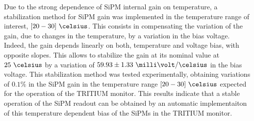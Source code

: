 \begin{enumerate}
\begin{enumerate}

Due to the strong dependence of SiPM internal gain on temperature, a stabilization method for SiPM gain was implemented in the temperature range of interest, $[20-30]~\celsius$. This consists in compensating the variation of the gain, due to changes in the temperature, by a variation in the bias voltage. Indeed, the gain depends linearly on both, temperature and voltage bias, with opposite slopes. This allows to stabilize the gain at its nominal value at $25~\celsius$ by a variation of $59.93 \pm 1.33 ~\milli\volt/\celsius$ in the bias voltage. This stabilization method was tested experimentally, obtaining variations of $0.1\%$ in the SiPM gain in the temperature range $[20-30]~\celsius$ expected for the operation of the TRITIUM monitor. This results indicate that a stable operation of the SiPM readout can be obtained by an automatic implementaiton of this temperature dependent bias of the SiPMs in the TRITIUM monitor.


\end{enumerate}
\end{enumerate}
